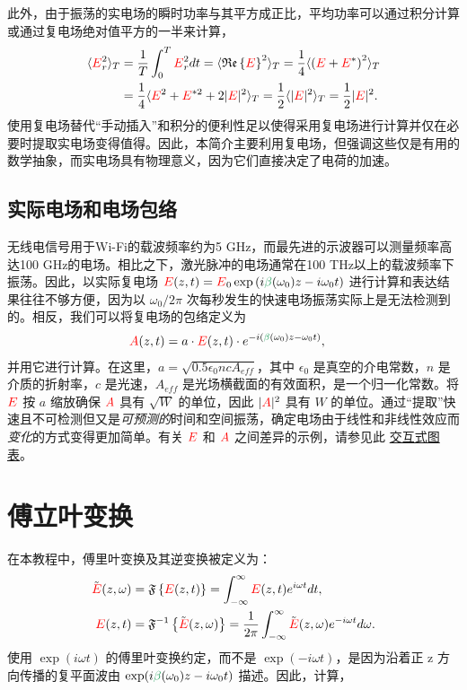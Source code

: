 此外，由于振荡的实电场的瞬时功率与其平方成正比，平均功率可以通过积分计算或通过复电场绝对值平方的一半来计算，
\begin{align}
\label{eq:average_power}
    \langle \textcolor{red}{E}_r^2 \rangle_T&= \frac{1}{T}\int_{0}^{T} \textcolor{red}{E}_r^2 dt = \langle\mathfrak{Re}\left\{\textcolor{red}{E}\right\}^2\rangle_T =\frac{1}{4}\langle\left(\textcolor{red}{E}+\textcolor{red}{E}^*\right)^2\rangle_T\\ \nonumber
&=\frac{1}{4}\langle \textcolor{red}{E}^2+\textcolor{red}{E}^{*2}+2|\textcolor{red}{E}|^2 \rangle_T=\frac{1}{2} \langle|\textcolor{red}{E}|^2\rangle_T=\frac{1}{2}|\textcolor{red}{E}|^2.
\end{align}
使用复电场替代“手动插入”和积分的便利性足以使得采用复电场进行计算并仅在必要时提取实电场变得值得。因此，本简介主要利用复电场，但强调这些仅是有用的数学抽象，而实电场具有物理意义，因为它们直接决定了电荷的加速。
\subsection{实际电场和电场包络}
无线电信号用于Wi-Fi的载波频率约为5 GHz，而最先进的示波器可以测量频率高达100 GHz的电场。相比之下，激光脉冲的电场通常在100 THz以上的载波频率下振荡。因此，以实际复电场 \(\E(z,t) = \E_0 \exp\left( i\betag(\omega_0)z - i\omega_0 t\right)\) 进行计算和表达结果往往不够方便，因为以 \(\omega_0/2\pi\) 次每秒发生的快速电场振荡实际上是无法检测到的。相反，我们可以将复电场的包络定义为
\begin{align}
\label{eq:envelope}
    \A(z,t) &=a\cdot\E(z,t)\cdot e^{-i(\betag(\omega_0)z-\omega_0t)},
\end{align}
并用它进行计算。在这里，\( a = \sqrt{0.5 \epsilon_0 n c A_{eff}} \)，其中 \(\epsilon_0\) 是真空的介电常数，\( n \) 是介质的折射率，\( c \) 是光速，\( A_{eff} \) 是光场横截面的有效面积，是一个归一化常数。将 \(\textcolor{red}{E}\) 按 \( a \) 缩放确保 \(\textcolor{red}{A}\) 具有 \(\sqrt{W}\) 的单位，因此 \( |\textcolor{red}{A}|^2 \) 具有 \( W \) 的单位。通过“提取”快速且不可检测但又是\emph{可预测的}时间和空间振荡，确定电场由于线性和非线性效应而\emph{变化}的方式变得更加简单。有关 \(\textcolor{red}{E}\) 和 \(\textcolor{red}{A}\) 之间差异的示例，请参见此 \href{https://www.desmos.com/calculator/rsw2fn5af6}{交互式图表}。


\section{傅立叶变换}

在本教程中，傅里叶变换及其逆变换被定义为：
\begin{align}
    \Tilde{\textcolor{red}{E}}(z,\omega) &= \mathfrak{F}\left\{\textcolor{red}{E}(z,t)\right\} = \int_{-\infty}^{\infty} \textcolor{red}{E}(z,t) e^{i\omega t} dt, \\ \nonumber
    \textcolor{red}{E}(z,t) &= \mathfrak{F}^{-1}\left\{\Tilde{\textcolor{red}{E}}(z,\omega)\right\} = \frac{1}{2\pi} \int_{-\infty}^{\infty} \Tilde{\textcolor{red}{E}}(z,\omega) e^{-i\omega t} d\omega.
\end{align}
使用 $\exp(i\omega t)$ 的傅里叶变换约定，而不是 $\exp(-i\omega t)$，是因为沿着正 z 方向传播的复平面波由 $\exp(i\betag(\omega_0)z-i\omega_0 t)$ 描述。因此，计算，

